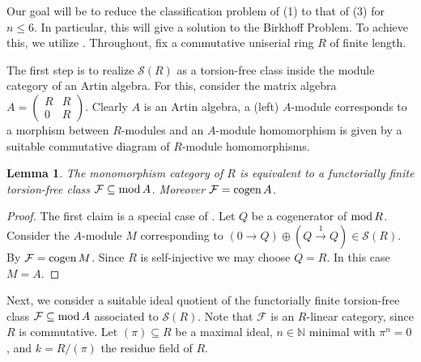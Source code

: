 \documentclass[a4paper]{amsart}
\renewcommand{\mod}{\textnormal{mod}\,}
\newcommand{\cogen}{\textnormal{cogen}\,}
\numberwithin{equation}{section} \theoremstyle{plain}
\numberwithin{thm}{section}
\newtheorem{lem}[thm]{Lemma}
\begin{document}
Our goal will be to reduce the classification problem of  (1) to that of (3) for $n \leq 6$. In particular, this will give a solution to the Birkhoff Problem. To achieve this, we utilize . Throughout, fix a commutative uniserial ring $R$ of finite length. 

The first step is to realize $\mathcal{S}(R)$ as a torsion-free class inside the module category of an Artin algebra. For this, consider the matrix algebra $A = \left(\begin{smallmatrix} R & R \\ 0 & R \end{smallmatrix}\right)$. Clearly $A$ is an Artin algebra, a (left) $A$-module corresponds to a morphism between $R$-modules and an $A$-module homomorphism is given by a suitable commutative diagram of $R$-module homomorphisms. 

\begin{lem}\label{L: ff} The monomorphism category of $R$ is equivalent to a functorially finite torsion-free class $\mathcal{F}\subseteq \mod A$. Moreover $\mathcal{F} = \cogen A$.
\end{lem}
\begin{proof} The first claim is a special case of \cite[Theorem 2.6]{kvamme}. Let $Q$ be a cogenerator of $\mod R$. Consider the $A$-module $M$ corresponding to $(0 \to Q) \oplus ( Q \xrightarrow{1} Q) \in \mathcal{S}(R)$. By \cite[Theorem 3.1 and Corollary 3.2]{LZ} $\mathcal{F} = \cogen M$. Since $R$ is self-injective we may choose $Q = R$. In this case $M =A$. 
\end{proof}

Next, we consider a suitable ideal quotient of the functorially finite torsion-free class $\mathcal{F} \subseteq \mod A$ associated to $\mathcal{S}(R)$. Note that $\mathcal{F}$ is an $R$-linear category, since $R$ is commutative. Let $(\pi) \subseteq R$ be a maximal ideal, $n\in \mathbb{N}$ minimal with $\pi^n =0$, and $k = R/(\pi)$ the residue field of $R$. 
\end{document}
